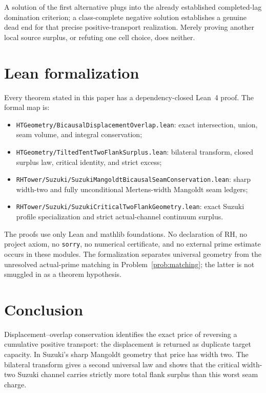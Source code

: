 \documentclass[11pt]{article}
\begin{document}
A solution of the first alternative plugs into the already established completed-lag domination
criterion; a class-complete negative solution establishes a genuine dead end for that precise
positive-transport realization.  Merely proving another local source surplus, or refuting one
cell choice, does neither.

\section{Lean formalization}

Every theorem stated in this paper has a dependency-closed Lean~4 proof.  The formal map is:

\begin{itemize}
\item \texttt{HTGeometry/BicausalDisplacementOverlap.lean}: exact intersection, union, seam volume,
and integral conservation;
\item \texttt{HTGeometry/TiltedTentTwoFlankSurplus.lean}: bilateral transform, closed surplus law,
critical identity, and strict excess;
\item \texttt{RHTower/Suzuki/SuzukiMangoldtBicausalSeamConservation.lean}: sharp width-two and fully
unconditional Mertens-width Mangoldt seam ledgers;
\item \texttt{RHTower/Suzuki/SuzukiCriticalTwoFlankGeometry.lean}: exact Suzuki profile specialization and
strict actual-channel continuum surplus.
\end{itemize}

The proofs use only Lean and mathlib foundations.  No declaration of RH, no project axiom, no
\texttt{sorry}, no numerical certificate, and no external prime estimate occurs in these modules.
The formalization separates universal geometry from the unresolved actual-prime matching in
Problem~\ref{prob:matching}; the latter is not smuggled in as a theorem hypothesis.

\section{Conclusion}

Displacement--overlap conservation identifies the exact price of reversing a cumulative positive
transport: the displacement is returned as duplicate target capacity.  In Suzuki's sharp
Mangoldt geometry that price has width two.  The bilateral transform gives a second universal law
and shows that the critical width-two Suzuki channel carries strictly more total flank surplus
than this worst seam charge.
\end{document}

